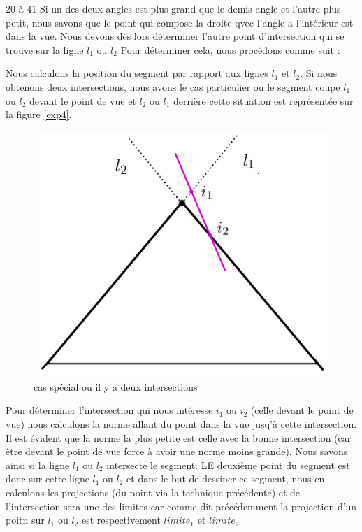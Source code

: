 \documentclass[11pt,a4paper]{article}
\begin{document}
20 à 41
Si un des deux angles est plus grand que le demis angle et l'autre plus petit, nous savons que le point qui compose la droite qvec l'angle a l'intérieur est dans la vue. Nous devons dès lors déterminer l'autre point d'intersection qui se trouve sur la ligne $l_1$ ou 
$l_2$ Pour déterminer cela, nous procédons comme suit :

Nous calculons la position du segment par rapport aux lignes $l_1$ et $l_2$. Si nous obtenons deux intersections, nous avons le cas particulier ou le segment coupe $l_1$ ou $l_2$ devant le point de vue et $l_2$ ou $l_1$ derrière cette situation est représentée sur la figure \ref{exp4}. 

\begin{figure}[H]
\centering
\includegraphics[scale=0.6]{casSpecial1.png}
\caption{cas spécial ou il y a deux intersections}
\label{exp_4}
\end{figure}

Pour déterminer l'intersection qui nous intéresse $i_1$ ou $i_2$ (celle devant le point de vue)  nous calculons la norme allant du point dans la vue jusq'à cette intersection. Il est évident que la norme la plus petite est celle avec la bonne intersection (car être devant le point de vue force à avoir une norme moins grande). Nous savons ainsi si la ligne $l_1$ ou $l_2$ intersecte le segment. LE deuxième point du segment est donc sur cette ligne $l_1$ ou $l_2$ et dans le but de dessiner ce segment, nous en calculons les projections (du point via la technique précédente) et de l'intersection sera une des limites car comme dit précédemment la projection d'un poitn sur $l_1$ ou $l_2$ est respectivement $limite_1$ et $limite_2$
\end{document}
